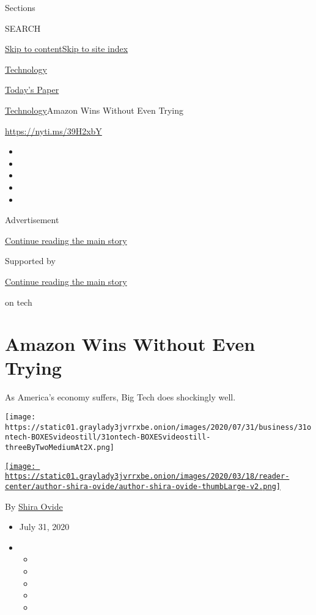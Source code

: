 Sections

SEARCH

\protect\hyperlink{site-content}{Skip to
content}\protect\hyperlink{site-index}{Skip to site index}

\href{https://www.nytimes3xbfgragh.onion/section/technology}{Technology}

\href{https://myaccount.nytimes3xbfgragh.onion/auth/login?response_type=cookie\&client_id=vi}{}

\href{https://www.nytimes3xbfgragh.onion/section/todayspaper}{Today's
Paper}

\href{/section/technology}{Technology}\textbar{}Amazon Wins Without Even
Trying

\url{https://nyti.ms/39H2xbY}

\begin{itemize}
\item
\item
\item
\item
\item
\end{itemize}

Advertisement

\protect\hyperlink{after-top}{Continue reading the main story}

Supported by

\protect\hyperlink{after-sponsor}{Continue reading the main story}

on tech

\hypertarget{amazon-wins-without-even-trying}{%
\section{Amazon Wins Without Even
Trying}\label{amazon-wins-without-even-trying}}

As America's economy suffers, Big Tech does shockingly well.

\texttt{[image: https://static01.graylady3jvrrxbe.onion/images/2020/07/31/business/31ontech-BOXESvideostill/31ontech-BOXESvideostill-threeByTwoMediumAt2X.png]}

\href{https://www.nytimes3xbfgragh.onion/by/shira-ovide}{\texttt{[image: https://static01.graylady3jvrrxbe.onion/images/2020/03/18/reader-center/author-shira-ovide/author-shira-ovide-thumbLarge-v2.png]}}

By \href{https://www.nytimes3xbfgragh.onion/by/shira-ovide}{Shira Ovide}

\begin{itemize}
\item
  July 31, 2020
\item
  \begin{itemize}
  \item
  \item
  \item
  \item
  \item
  \end{itemize}
\end{itemize}

